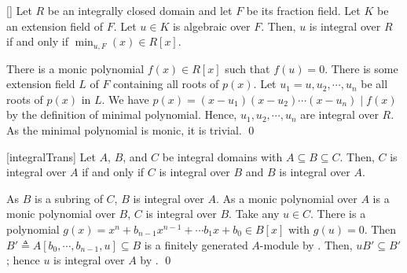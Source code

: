 \documentclass[../modern_algebra_2.tex]{subfiles}
\begin{document}
\begin{Lemma}{}[]
    Let \(R\) be an integrally closed domain and let \(F\) be its fraction field.
    Let \(K\) be an extension field of \(F\).
    Let \(u \in K\) is algebraic over \(F\).
    Then, \(u\) is integral over \(R\) if and only if \(\min_{u,F}(x) \in R[x]\).
\end{Lemma}
\begin{myclaim}[Proof]\hfill
\begin{pftfae}[labelwidth=\widthof{(\(\Rightarrow\))}]
    \ii[(\(\Rightarrow\))]
    There is a monic polynomial \(f(x) \in R[x]\) such that \(f(u) = 0\).
    There is some extension field \(L\) of \(F\)
    containing all roots of \(p(x)\).
    Let \(u_1 = u, u_2, \cdots, u_n\) be all roots of \(p(x)\) in \(L\).
    We have \(p(x) = (x-u_1)(x-u_2)\cdots(x-u_n) \mid f(x)\) by the definition of minimal polynomial.
    Hence, \(u_1, u_2, \cdots, u_n\) are integral over \(R\).
    \ii[(\(\Leftarrow\))]
    As the minimal polynomial is monic, it is trivial.
    \qed
\end{pftfae}
\end{myclaim}

\begin{Theorem}{}[integralTrans]
    Let \(A\), \(B\), and \(C\) be integral domains with \(A \subseteq B \subseteq C\).
    Then, \(C\) is integral over \(A\) if and only if
    \(C\) is integral over \(B\) and \(B\) is integral over \(A\).
\end{Theorem}
\begin{myclaim}[Proof]\hfill
\begin{pftfae}[labelwidth=\widthof{(\(\Rightarrow\))}]
    \ii[(\(\Rightarrow\))]
    As \(B\) is a subring of \(C\), \(B\) is integral over \(A\).
    As a monic polynomial over \(A\) is a monic polynomial over \(B\), \(C\) is integral over \(B\).
    \ii[(\(\Leftarrow\))]
    Take any \(u \in C\).
    There is a polynomial \(g(x) = x^n + b_{n-1}x^{n-1} + \cdots b_1x + b_0 \in B[x]\) with \(g(u) = 0\).
    Then \(B' \triangleq A[b_0, \cdots, b_{n-1}, u] \subseteq B\) is a finitely generated
    \(A\)-module by .
    Then, \(uB' \subseteq B'\); hence \(u\) is integral over \(A\) by .
    \qed
\end{pftfae}
\end{myclaim}
\end{document}
